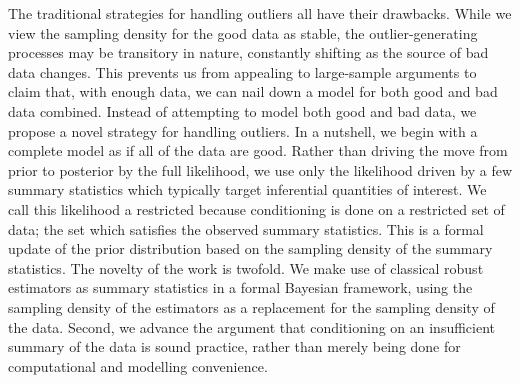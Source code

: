 \documentclass[12pt]{article}
\newcommand{\red}[1]{{\color{red}#1}}
\newcommand{\green}[1]{{\color{green}#1}}
\begin{document}
The traditional strategies for handling outliers all have their drawbacks.  While we view the sampling density for the good data as stable, the outlier-generating processes 
may be transitory in nature, constantly shifting as the source of bad data changes.  This prevents us from appealing to large-sample arguments to claim that, with enough data, we can nail down a model for both good and bad data combined.  Instead of attempting to model both good and bad data, we propose a novel strategy for handling outliers. In a nutshell, we begin with a complete model  as if all of the data are good. Rather than driving the move from prior to posterior  by the full likelihood, we use only the likelihood
driven by a few summary statistics which typically target inferential quantities
of interest.  We call this likelihood a restricted because conditioning is done on a restricted set of data; the set which satisfies the observed summary statistics. This is a formal update of the prior distribution based on the sampling density of the summary statistics. The novelty of the work is twofold.  We make use of classical robust estimators as  summary statistics in a formal
Bayesian framework, using the sampling density of the estimators as a replacement for the 
sampling density of the data.  Second, we advance the argument that conditioning on an insufficient summary of the data is sound practice, rather than merely being done for computational and modelling convenience.  

\end{document}

